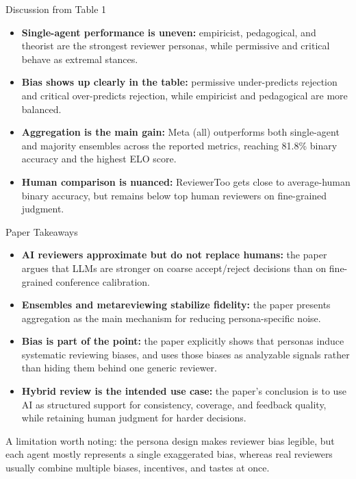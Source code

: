 \documentclass[aspectratio=169]{beamer}
\begin{document}
\begin{frame}{Discussion from Table 1}
\begin{itemize}
    \item \textbf{Single-agent performance is uneven:} empiricist, pedagogical, and theorist are the strongest reviewer personas, while permissive and critical behave as extremal stances.
    \item \textbf{Bias shows up clearly in the table:} permissive under-predicts rejection and critical over-predicts rejection, while empiricist and pedagogical are more balanced.
    \item \textbf{Aggregation is the main gain:} Meta (all) outperforms both single-agent and majority ensembles across the reported metrics, reaching 81.8\% binary accuracy and the highest ELO score.
    \item \textbf{Human comparison is nuanced:} ReviewerToo gets close to average-human binary accuracy, but remains below top human reviewers on fine-grained judgment.
\end{itemize}
\end{frame}

\begin{frame}{Paper Takeaways}
\begin{itemize}
    \item \textbf{AI reviewers approximate but do not replace humans:} the paper argues that LLMs are stronger on coarse accept/reject decisions than on fine-grained conference calibration.
    \item \textbf{Ensembles and metareviewing stabilize fidelity:} the paper presents aggregation as the main mechanism for reducing persona-specific noise.
    \item \textbf{Bias is part of the point:} the paper explicitly shows that personas induce systematic reviewing biases, and uses those biases as analyzable signals rather than hiding them behind one generic reviewer.
    \item \textbf{Hybrid review is the intended use case:} the paper's conclusion is to use AI as structured support for consistency, coverage, and feedback quality, while retaining human judgment for harder decisions.
\end{itemize}
\vspace{0.5em}
\begin{notebox}
A limitation worth noting: the persona design makes reviewer bias legible, but each agent mostly represents a single exaggerated bias, whereas real reviewers usually combine multiple biases, incentives, and tastes at once.
\end{notebox}
\end{frame}
\end{document}
